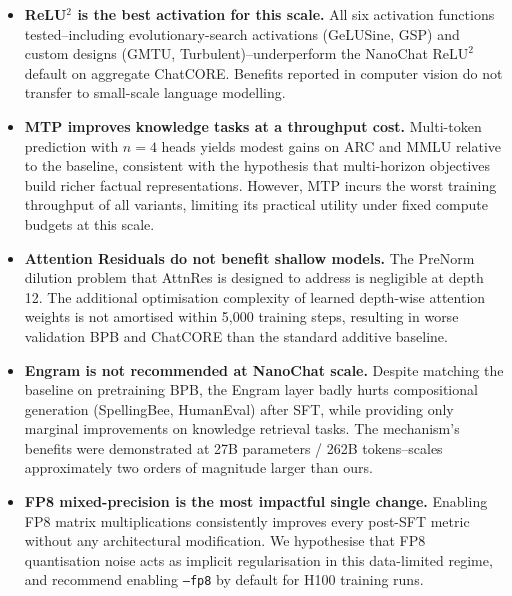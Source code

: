 \begin{itemize}

  \item \textbf{ReLU\(^2\) is the best activation for this scale.}
  All six activation functions tested--including evolutionary-search activations (GeLUSine, GSP)
  and custom designs (GMTU, Turbulent)--underperform the NanoChat $\mathrm{ReLU}^2$ default on
  aggregate ChatCORE.
  Benefits reported in computer vision do not transfer to small-scale language modelling.

  \item \textbf{MTP improves knowledge tasks at a throughput cost.}
  Multi-token prediction with $n=4$ heads yields modest gains on ARC and MMLU relative to the
  baseline, consistent with the hypothesis that multi-horizon objectives build richer factual
  representations.
  However, MTP incurs the worst training throughput of all variants, limiting its practical
  utility under fixed compute budgets at this scale.

  \item \textbf{Attention Residuals do not benefit shallow models.}
  The PreNorm dilution problem that AttnRes \parencite{chen2026attnres} is designed to address is
  negligible at depth 12.
  The additional optimisation complexity of learned depth-wise attention weights is not amortised
  within 5{,}000 training steps, resulting in worse validation BPB and ChatCORE than the
  standard additive baseline.

  \item \textbf{Engram is not recommended at NanoChat scale.}
  Despite matching the baseline on pretraining BPB, the Engram layer badly hurts compositional
  generation (SpellingBee, HumanEval) after SFT, while providing only marginal improvements on
  knowledge retrieval tasks.
  The mechanism's benefits were demonstrated at 27B parameters / 262B tokens--scales
  approximately two orders of magnitude larger than ours.

  \item \textbf{FP8 mixed-precision is the most impactful single change.}
  Enabling FP8 matrix multiplications consistently improves every post-SFT metric without any
  architectural modification.
  We hypothesise that FP8 quantisation noise acts as implicit regularisation in this
  data-limited regime, and recommend enabling \texttt{--fp8} by default for H100 training runs.

\end{itemize}

